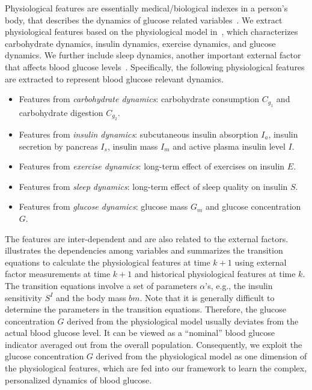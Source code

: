 Physiological features are essentially medical/biological indexes in a person's body, that describes the dynamics of glucose related variables~\cite{bib:duke2010intelligent, bib:MAIHA14:Plis}.
We extract physiological features based on the physiological model in~\cite{bib:duke2010intelligent}, which characterizes carbohydrate dynamics, insulin dynamics, exercise dynamics, and glucose dynamics.
We further include sleep dynamics, another important external factor that affects blood glucose levels~\cite{bib:DRCP15:Iwasaki}.
Specifically, the following physiological features are extracted to represent blood glucose relevant dynamics.
\begin{itemize}
  \item
  Features from \emph{carbohydrate dynamics}:
  carbohydrate consumption $C_{g_1}$ and carbohydrate digestion $C_{g_2}$.
  \item
  Features from \emph{insulin dynamics}:
  subcutaneous insulin absorption $I_{a}$, insulin secretion by pancreas $I_{s}$, insulin mass $I_{m}$ and active plasma insulin level $I$.
  \item
  Features from \emph{exercise dynamics}:
  long-term effect of exercises on insulin $E$.
  \item
  Features from \emph{sleep dynamics}:
  long-term effect of sleep quality on insulin $S$.
  \item
  Features from \emph{glucose dynamics}:
  glucose mass $G_m$ and glucose concentration $G$.
\end{itemize}
The features are inter-dependent and are also related to the external factors.
 illustrates the dependencies among variables and  summarizes the transition equations to calculate the physiological features at time $k+1$ using external factor measurements at time $k+1$ and historical physiological features at time $k$.
The transition equations involve a set of parameters $\alpha$'s, e.g., the insulin sensitivity $S^I$ and the body mass $bm$.
Note that it is generally difficult to determine the parameters in the transition equations.
Therefore, the glucose concentration $G$ derived from the physiological model usually deviates from the actual blood glucose level.
It can be viewed as a ``nominal'' blood glucose indicator averaged out from the overall population.
Consequently, we exploit the glucose concentration $G$ derived from the physiological model as one dimension of the physiological features, which are fed into our \modelname framework to learn the complex, personalized dynamics of blood glucose.

